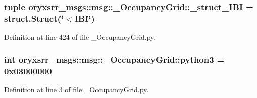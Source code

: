 \subsubsection[{\-\_\-struct\-\_\-\-I\-B\-I}]{\setlength{\rightskip}{0pt plus 5cm}tuple {\bf oryxsrr\-\_\-msgs\-::msg\-::\-\_\-\-Occupancy\-Grid\-::\-\_\-struct\-\_\-\-I\-B\-I} = struct.\-Struct(\char`\"{}$<$\-I\-B\-I\char`\"{})}\label{namespaceoryxsrr__msgs_1_1msg_1_1__OccupancyGrid_a80b8336bfcbcb566ca4adeda5e2070ca}


\-Definition at line 424 of file \-\_\-\-Occupancy\-Grid.\-py.

\subsubsection[{python3}]{\setlength{\rightskip}{0pt plus 5cm}int {\bf oryxsrr\-\_\-msgs\-::msg\-::\-\_\-\-Occupancy\-Grid\-::python3} = 0x03000000}\label{namespaceoryxsrr__msgs_1_1msg_1_1__OccupancyGrid_acf93e5cd759a92fc75bc24c2defa8e72}


\-Definition at line 3 of file \-\_\-\-Occupancy\-Grid.\-py.

